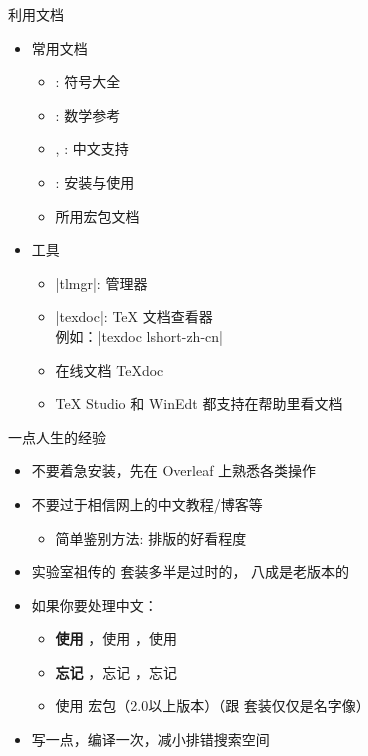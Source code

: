 \begin{frame}[fragile]{利用文档}
  \begin{itemize}
    \item 常用文档
      \begin{itemize}
        \item {}: 符号大全
        \item {}: 数学参考
        \item {}, : 中文支持
        \item {}: \TL 安装与使用
        \item 所用宏包文档
      \end{itemize}
    \item 工具
      \begin{itemize}
        \item |tlmgr|: \TL 管理器
        \item |texdoc|: \TeX{} 文档查看器\\
          例如：|texdoc lshort-zh-cn|
        \item 在线文档 \TeX{}doc 
        \item TeX Studio 和 WinEdt 都支持在帮助里看文档
      \end{itemize}
  \end{itemize}
\end{frame}

\begin{frame}{一点人生的经验}
  \begin{itemize}
    \item 不要着急安装，先在 Overleaf 上熟悉各类操作
    \item 不要过于相信网上的中文教程/博客等
      \begin{itemize}
        \item 简单鉴别方法: 排版的好看程度
      \end{itemize}
    \item 实验室祖传的 \CTeX{} 套装多半是过时的，\ThuThesis{} 八成是老版本的
    \item 如果你要处理中文：
      \begin{itemize}
        \item \textbf{使用 \XeLaTeX{}}，使用 \XeLaTeX{}，使用 \XeLaTeX{}
        \item \textbf{忘记 }，忘记 ，忘记 
        \item 使用  宏包（2.0以上版本）（跟 \CTeX{} 套装仅仅是名字像）
      \end{itemize}
    \item 写一点，编译一次，减小排错搜索空间
  \end{itemize}
\end{frame}

